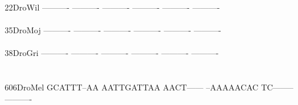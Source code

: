 \documentclass[11pt,twoside,reqno,a4paper]{article}
\begin{document}
{22\hspace*{3\charwidth}DroWil	----------	----------	----------	----------	----------	----------	\\
\hspace*{5\charwidth}\hspace*{7\charwidth}\hspace*{1\charwidth}\hspace*{1\charwidth}\hspace*{1\charwidth}\hspace*{1\charwidth}\hspace*{1\charwidth}\hspace*{1\charwidth}\\
35\hspace*{3\charwidth}DroMoj	----------	----------	----------	----------	----------	----------	\\
\hspace*{5\charwidth}\hspace*{7\charwidth}\hspace*{1\charwidth}\hspace*{1\charwidth}\hspace*{1\charwidth}\hspace*{1\charwidth}\hspace*{1\charwidth}\hspace*{1\charwidth}\\
38\hspace*{3\charwidth}DroGri	----------	----------	----------	----------	----------	----------	\\
\hspace*{5\charwidth}\hspace*{7\charwidth}\hspace*{1\charwidth}\hspace*{1\charwidth}\hspace*{1\charwidth}\hspace*{1\charwidth}\hspace*{1\charwidth}\hspace*{1\charwidth}\\
\\
606\hspace*{2\charwidth}DroMel	GCATTT--AA	AATTGATTAA	AACT------	--AAAAACAC	TC--------	----------	\\
\hspace*{5\charwidth}\hspace*{7\charwidth}\hspace*{1\charwidth}\hspace*{1\charwidth}\hspace*{1\charwidth}\hspace*{1\charwidth}\hspace*{1\charwidth}\hspace*{1\charwidth}\\
}
\end{document}
